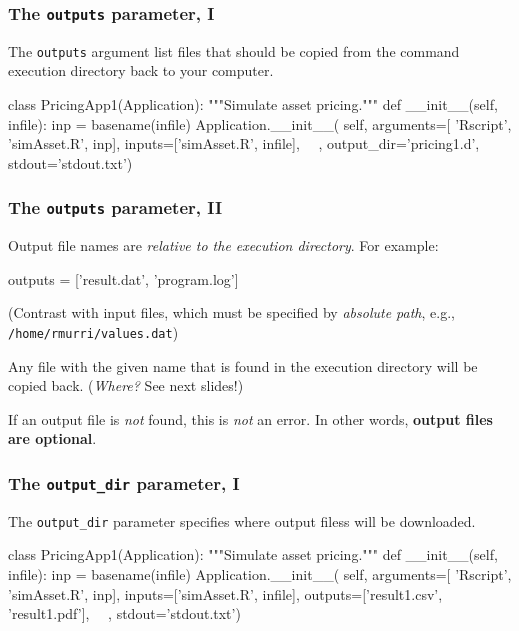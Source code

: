 \documentclass[english,serif,mathserif,xcolor=pdftex,dvipsnames,table]{beamer}
\begin{document}
\begin{frame}[fragile]
\frametitle{The \texttt{outputs} parameter, I}

The \texttt{outputs} argument list files that should be copied from
the command execution directory back to your computer.

  \+
\begin{python}
class PricingApp1(Application):
  """Simulate asset pricing."""
  def __init__(self, infile):
    inp = basename(infile)
    Application.__init__(
      self,
      arguments=[
        'Rscript', 'simAsset.R', inp],
      inputs=['simAsset.R', infile],
      ~~,
      output_dir='pricing1.d',
      stdout='stdout.txt')
\end{python}
\end{frame}


\begin{frame}[fragile]
  \frametitle{The \texttt{outputs} parameter, II}

  Output file names are \emph{relative to the execution directory}.
  For example:
  \begin{python}
    outputs = ['result.dat', 'program.log']
  \end{python}

  \+
  (Contrast with input files, which must be specified by
  \emph{absolute path}, e.g., \texttt{/home/rmurri/values.dat})

  \+
  Any file with the given name that is found in the execution
  directory will be copied back. (\emph{Where?} See next slides!)

  \+
  If an output file is \emph{not} found, this is \emph{not} an
  error. In other words, \textbf{output files are optional}.
\end{frame}


\begin{frame}[fragile]
\frametitle{The \texttt{output\_dir} parameter, I}

The \lstinline|output_dir| parameter specifies where output filess
will be downloaded.

\+
\begin{python}
class PricingApp1(Application):
  """Simulate asset pricing."""
  def __init__(self, infile):
    inp = basename(infile)
    Application.__init__(
      self,
      arguments=[
        'Rscript', 'simAsset.R', inp],
      inputs=['simAsset.R', infile],
      outputs=['result1.csv', 'result1.pdf'],
      ~~,
      stdout='stdout.txt')
\end{python}
\end{frame}
\end{document}
